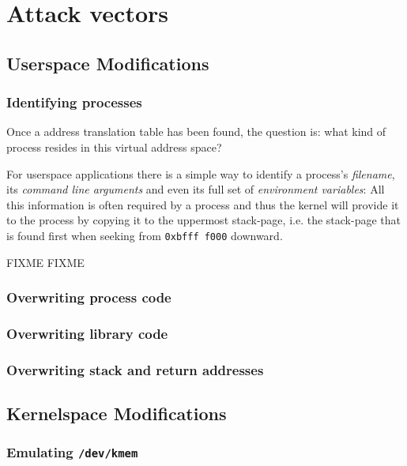 %
%

\section{Attack vectors}



\subsection{Userspace Modifications}

\subsubsection{Identifying processes}

Once a address translation table has been found, the question is: what kind of
process resides in this virtual address space?

For userspace applications there is a simple way to identify a process's
\emph{filename}, its \emph{command line arguments} and even its full set of
\emph{environment variables}: All this information is often required by a
process and thus the kernel will provide it to the process by copying it to the
uppermost stack-page, i.e.  the stack-page that is found first when seeking from
\texttt{0xbfff f000} downward.

FIXME FIXME

\subsubsection{Overwriting process code}

\subsubsection{Overwriting library code}

\subsubsection{Overwriting stack and return addresses}



\subsection{Kernelspace Modifications}

\subsubsection{Emulating \texttt{/dev/kmem}}

